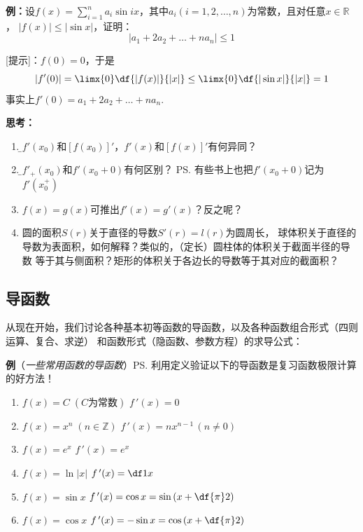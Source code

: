 {\bf 例：}设$f(x)=\sum\limits_{i=1}^na_i\sin
ix$，其中$a_i(i=1,2,\ldots,n)$为常数，且对任意$x\in\mathbb{R}$， 
$|f(x)|\leq |\sin x|$，证明：
$$\left|a_1+2a_2+\ldots+na_n\right|\leq 1$$

[提示]：$f(0)=0$，于是
$$|f'(0)|=\limx{0}\df{|f(x)|}{|x|}\leq\limx{0}\df{|\sin x|}{|x|}=1$$
事实上$f'(0)=a_1+2a_2+\ldots+na_n$.

{\bf 思考：}
\begin{enumerate} 
  \setlength{\itemindent}{1cm}
  \item {\b $f'(x_0)$和$[f(x_0)]'$，$f'(x)$和$[f(x)]'$有何异同？}
  \item {\b $f'_+(x_0)$和$f'(x_0+0)$有何区别？}
  \ps{有些书上也把$f'(x_0+0)$记为$f'(x_0^+)$}
  \item $f(x)=g(x)$可推出$f'(x)=g'(x)$？反之呢？
  \item 圆的面积$S(r)$关于直径的导数$S'(r)=l(r)$为圆周长，
  球体积关于直径的导数为表面积，如何解释？类似的，（定长）圆柱体的体积关于截面半径的导数
  等于其与侧面积？矩形的体积关于各边长的导数等于其对应的截面积？
\end{enumerate}

\subsection{导函数}

从现在开始，我们讨论各种基本初等函数的导函数，以及各种函数组合形式（四则运算、复合、求逆）
和函数形式（隐函数、参数方程）的求导公式：

{\b
{\bf 例}（{\it 一些常用函数的导函数}）\ps{利用定义验证以下的导函数是复习函数极限计算的好方法！}
\begin{enumerate}[(1)]
  \setlength{\itemindent}{1cm}
  \item $f(x)=C\;(C\mbox{为常数})$ \hfill $f\,'(x)=0$ 
  \item $f(x)=x^n\;(n\in\mathbb{Z})$ \hfill $f\,'(x)=nx^{n-1}\,(n\ne
  0)$ 
  \item $f(x)=e^x$ \hfill $f\,'(x)=e^x$ 
  \item $f(x)=\ln|x|$ \hfill $f\,'(x)=\df 1x$ 
  \item $f(x)=\sin x$ \hfill $f\,'(x)=\cos x=\sin\left(x+\df{\pi}2\right)$ 
  \item $f(x)=\cos x$ \hfill $f\,'(x)=-\sin x=\cos\left(x+\df{\pi}2\right)$
\end{enumerate}
}

